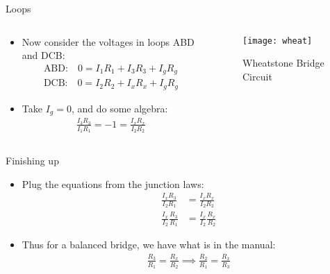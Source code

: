 \documentclass{beamer}
\theoremstyle{remark}
\begin{document}
\begin{frame}{Loops}
  \begin{columns}
    \begin{column}{0.6\textwidth}
      \begin{itemize}
      \item Now consider the voltages in loops ABD and DCB:
        \begin{align*}
          \text{ABD:}\quad 0=I_1R_1+I_3R_3+I_gR_g\\
          \text{DCB:}\quad 0=I_2R_2+I_xR_x+I_gR_g
        \end{align*}
      \item Take $I_g=0$, and do some algebra:
        \begin{align*}
          \frac{I_3R_3}{I_1R_1}=-1=\frac{I_xR_x}{I_2R_2}
        \end{align*}
      \end{itemize}
    \end{column}
    \begin{column}{0.4\textwidth}
      \begin{figure}[H]
        \centering
        \texttt{[image: wheat]}
        \caption{Wheatstone Bridge Circuit}
      \end{figure}
    \end{column}
  \end{columns}
\end{frame}

\begin{frame}{Finishing up}
  \begin{itemize}
  \item Plug the equations from the junction laws:
    \begin{align*}
      \frac{I_xR_3}{I_2R_1}&=\frac{I_xR_x}{I_2R_2}\\
      \frac{I_x}{I_2}\frac{R_3}{R_1}&=\frac{I_x}{I_2}\frac{R_x}{R_2}
    \end{align*}
  \item Thus for a balanced bridge, we have what is in the manual:
    \begin{align*}
      \boxed{\frac{R_3}{R_1}=\frac{R_x}{R_2}\implies
      \frac{R_2}{R_1}=\frac{R_x}{R_3}}
    \end{align*}
  \end{itemize}
\end{frame}
\end{document}

